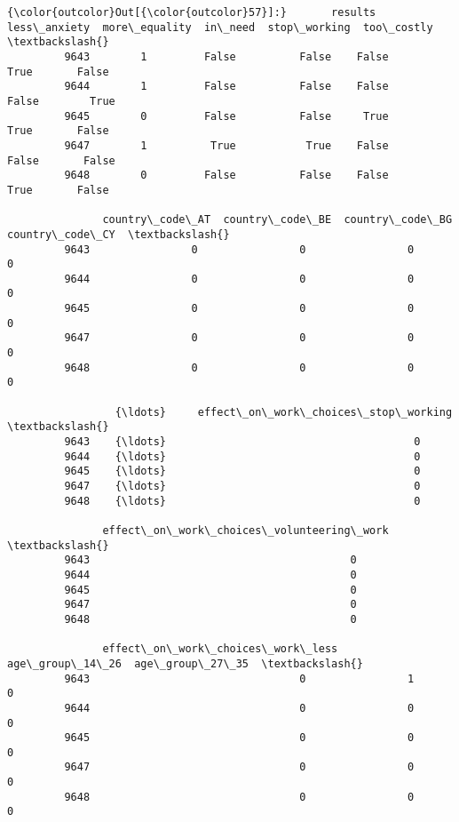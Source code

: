 \documentclass[11pt]{article}
\begin{document}
\begin{Verbatim}[commandchars=\\\{\}]
{\color{outcolor}Out[{\color{outcolor}57}]:}       results  less\_anxiety  more\_equality  in\_need  stop\_working  too\_costly  \textbackslash{}
         9643        1         False          False    False          True       False   
         9644        1         False          False    False         False        True   
         9645        0         False          False     True          True       False   
         9647        1          True           True    False         False       False   
         9648        0         False          False    False          True       False   
         
               country\_code\_AT  country\_code\_BE  country\_code\_BG  country\_code\_CY  \textbackslash{}
         9643                0                0                0                0   
         9644                0                0                0                0   
         9645                0                0                0                0   
         9647                0                0                0                0   
         9648                0                0                0                0   
         
                 {\ldots}     effect\_on\_work\_choices\_stop\_working  \textbackslash{}
         9643    {\ldots}                                       0   
         9644    {\ldots}                                       0   
         9645    {\ldots}                                       0   
         9647    {\ldots}                                       0   
         9648    {\ldots}                                       0   
         
               effect\_on\_work\_choices\_volunteering\_work  \textbackslash{}
         9643                                         0   
         9644                                         0   
         9645                                         0   
         9647                                         0   
         9648                                         0   
         
               effect\_on\_work\_choices\_work\_less  age\_group\_14\_26  age\_group\_27\_35  \textbackslash{}
         9643                                 0                1                0   
         9644                                 0                0                0   
         9645                                 0                0                0   
         9647                                 0                0                0   
         9648                                 0                0                0   
         

\end{Verbatim}
\end{document}
